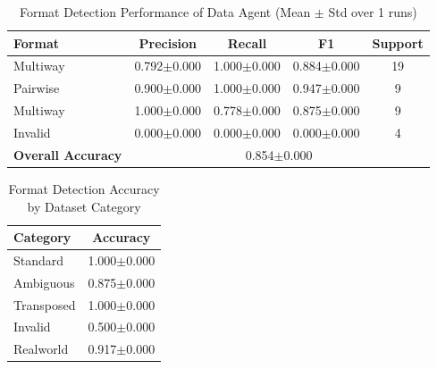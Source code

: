 \begin{table}[htbp]
\centering
\caption{Format Detection Performance of Data Agent (Mean $\pm$ Std over 1 runs)}
\label{tab:format_detection}
\begin{tabular}{lcccc}
\toprule
Format & Precision & Recall & F1 & Support \\
\midrule
Multiway & 0.792$\pm$0.000 & 1.000$\pm$0.000 & 0.884$\pm$0.000 & 19 \\
Pairwise & 0.900$\pm$0.000 & 1.000$\pm$0.000 & 0.947$\pm$0.000 & 9 \\
Multiway & 1.000$\pm$0.000 & 0.778$\pm$0.000 & 0.875$\pm$0.000 & 9 \\
Invalid & 0.000$\pm$0.000 & 0.000$\pm$0.000 & 0.000$\pm$0.000 & 4 \\
\midrule
\textbf{Overall Accuracy} & \multicolumn{4}{c}{0.854$\pm$0.000} \\
\bottomrule
\end{tabular}
\end{table}

\begin{table}[htbp]
\centering
\caption{Format Detection Accuracy by Dataset Category}
\label{tab:format_by_category}
\begin{tabular}{lc}
\toprule
Category & Accuracy \\
\midrule
Standard & 1.000$\pm$0.000 \\
Ambiguous & 0.875$\pm$0.000 \\
Transposed & 1.000$\pm$0.000 \\
Invalid & 0.500$\pm$0.000 \\
Realworld & 0.917$\pm$0.000 \\
\bottomrule
\end{tabular}
\end{table}
